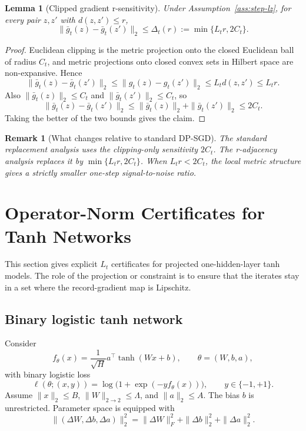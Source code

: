 \documentclass[conference,compsoc]{IEEEtran}
\newtheorem{lemma}{Lemma}
\newtheorem{remark}{Remark}
\begin{document}
\begin{lemma}[Clipped gradient r-sensitivity]
\label{lem:clipped-sensitivity}
Under Assumption~\ref{ass:step-lz}, for every pair $z,z'$ with $d(z,z')\le r$,
\[
\|\bar g_t(z)-\bar g_t(z')\|_2
\le
\Delta_t(r)
:=\min\{L_t r,2C_t\}.
\]
\end{lemma}

\begin{proof}
Euclidean clipping is the metric projection onto the closed Euclidean ball of radius $C_t$, and metric projections onto closed convex sets in Hilbert space are non-expansive. Hence
\[
\|\bar g_t(z)-\bar g_t(z')\|_2
\le
\|g_t(z)-g_t(z')\|_2
\le L_t d(z,z')
\le L_t r.
\]
Also $\|\bar g_t(z)\|_2\le C_t$ and $\|\bar g_t(z')\|_2\le C_t$, so
\[
\|\bar g_t(z)-\bar g_t(z')\|_2
\le \|\bar g_t(z)\|_2+\|\bar g_t(z')\|_2
\le 2C_t.
\]
Taking the better of the two bounds gives the claim.
\end{proof}

\begin{remark}[What changes relative to standard DP-SGD]
The standard replacement analysis uses the clipping-only sensitivity $2C_t$. The r-adjacency analysis replaces it by $\min\{L_t r,2C_t\}$. When $L_t r<2C_t$, the local metric structure gives a strictly smaller one-step signal-to-noise ratio.
\end{remark}

\section{Operator-Norm Certificates for Tanh Networks}
\label{sec:tanh-certificates}

This section gives explicit $L_t$ certificates for projected one-hidden-layer tanh models. The role of the projection or constraint is to ensure that the iterates stay in a set where the record-gradient map is Lipschitz.

\subsection{Binary logistic tanh network}

Consider
\[
f_\theta(x)=\frac{1}{\sqrt H}a^\top\tanh(Wx+b),
\qquad
\theta=(W,b,a),
\]
with binary logistic loss
\[
\ell(\theta;(x,y))=\log\bigl(1+\exp(-y f_\theta(x))\bigr),
\qquad y\in\{-1,+1\}.
\]
Assume $\|x\|_2\le B$, $\|W\|_{2\to2}\le \Lambda$, and $\|a\|_2\le A$. The bias $b$ is unrestricted. Parameter space is equipped with
\[
\|(\Delta W,\Delta b,\Delta a)\|_2^2
=\|\Delta W\|_F^2+\|\Delta b\|_2^2+\|\Delta a\|_2^2.
\]
\end{document}
